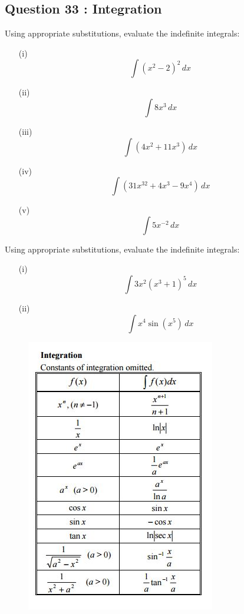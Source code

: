 \documentclass[]{article}
\begin{document}
\subsection*{Question 33 : Integration}
Using appropriate substitutions, evaluate the indefinite integrals:
\begin{multicols}{2}
	\begin{itemize}
		
		\item[(i)] \[\int (x^2-2)^{2}\, dx\]
		\item[(ii)] \[\int 8x^3\, dx\]
		\item[(iii)]\[ \int (4x^2+11x^3)\, dx\]
		\item[(iv)] \[\int (31x^{32}+4x^3-9x^4) \,dx\]
		\item[(v)] \[\int 5x^{-2}\, dx\]
	\end{itemize}
\end{multicols}
Using appropriate substitutions, evaluate the indefinite integrals:
\begin{multicols}{2}
	\begin{itemize}
	
	\item[(i)]	
	\[\int 3x^2 (x^3+1)^5 \, dx\]
	
	\item[(ii)]
	\[\int x^4 \sin(x^5) \, dx\]
	\end{itemize}
\end{multicols}
\bigskip

\begin{figure}[h!]
	\centering
	\includegraphics[width=0.55\linewidth]{integrationtabless}
\end{figure}
\end{document}

